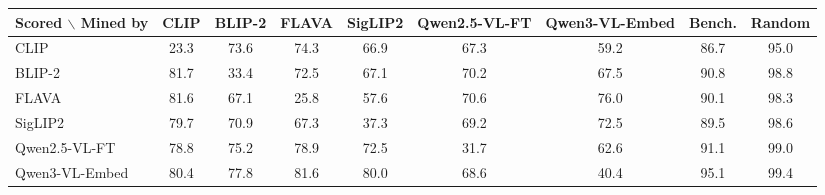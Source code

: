 \begin{tabular}{l cccccccc}
\toprule
Scored $\backslash$ Mined by & CLIP & BLIP-2 & FLAVA & SigLIP2 & Qwen2.5-VL-FT & Qwen3-VL-Embed & Bench. & Random\\
\midrule
CLIP & 23.3 & 73.6 & 74.3 & 66.9 & 67.3 & 59.2 & 86.7 & 95.0 \\
BLIP-2 & 81.7 & 33.4 & 72.5 & 67.1 & 70.2 & 67.5 & 90.8 & 98.8 \\
FLAVA & 81.6 & 67.1 & 25.8 & 57.6 & 70.6 & 76.0 & 90.1 & 98.3 \\
SigLIP2 & 79.7 & 70.9 & 67.3 & 37.3 & 69.2 & 72.5 & 89.5 & 98.6 \\
Qwen2.5-VL-FT & 78.8 & 75.2 & 78.9 & 72.5 & 31.7 & 62.6 & 91.1 & 99.0 \\
Qwen3-VL-Embed & 80.4 & 77.8 & 81.6 & 80.0 & 68.6 & 40.4 & 95.1 & 99.4 \\
\bottomrule
\end{tabular}
